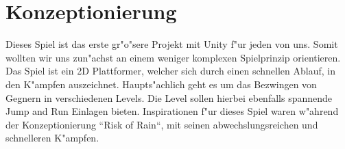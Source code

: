 \chapter{Konzeptionierung}
Dieses Spiel ist das erste gr"o"sere Projekt mit Unity f"ur jeden von uns. Somit wollten wir uns zun"achst an einem weniger komplexen Spielprinzip orientieren.
Das Spiel ist ein 2D Plattformer, welcher sich durch einen schnellen Ablauf, in den K"ampfen auszeichnet. Haupts"achlich geht es um das Bezwingen von Gegnern in verschiedenen Levels. Die Level sollen hierbei ebenfalls spannende Jump and Run Einlagen bieten.
Inspirationen f"ur dieses Spiel waren w"ahrend der Konzeptionierung ``Risk of Rain``, mit seinen abwechslungsreichen und schnelleren K"ampfen.

